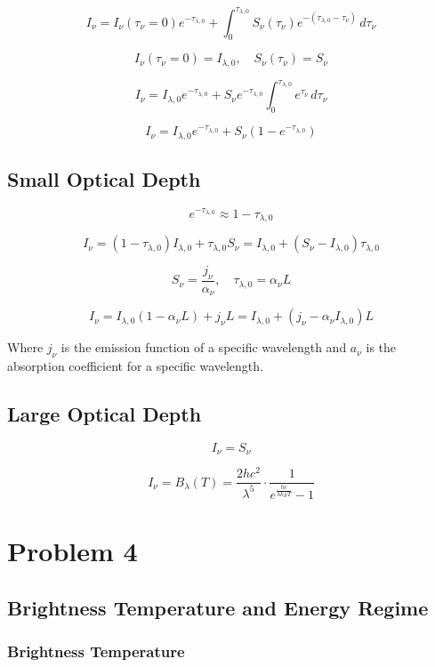 \documentclass[12pt]{article}
\begin{document}
\[
    I_\nu = I_\nu(\tau_\nu=0) e^{-\tau_{\lambda,0}} + \int_{0}^{\tau_{\lambda,0}} S_\nu(\tau_\nu) e^{-(\tau_{\lambda,0} - \tau_\nu)} \, d\tau_\nu
\]

\[
    I_\nu(\tau_\nu=0) = I_{\lambda,0},\quad S_\nu(\tau_\nu) = S_\nu
\]

\[
    I_\nu = I_{\lambda,0} e^{-\tau_{\lambda,0}} + S_\nu e^{-\tau_{\lambda,0}} \int_{0}^{\tau_{\lambda,0}} e^{\tau_\nu} \, d\tau_\nu
\]

\[
    I_\nu = I_{\lambda,0} e^{-\tau_{\lambda,0}} + S_\nu (1 - e^{-\tau_{\lambda,0}})
\]

\subsection{Small Optical Depth}

\[
    e^{-\tau_{\lambda,0}} \approx 1 - \tau_{\lambda,0}
\]

\[
    I_\nu = (1 - \tau_{\lambda,0})I_{\lambda,0} + \tau_{\lambda,0}S_\nu = I_{\lambda,0} + (S_\nu - I_{\lambda,0})\tau_{\lambda,0}
\]

\[
    S_\nu = \frac{j_\nu}{\alpha_\nu},\quad \tau_{\lambda,0} = \alpha_\nu L
\]

\[
    I_\nu = I_{\lambda,0} (1 - \alpha_\nu L) + j_\nu L = I_{\lambda,0} + (j_\nu - \alpha_\nu I_{\lambda,0})L
\]

Where $j_\nu$ is the emission function of a specific wavelength and $a_\nu$ is the absorption coefficient for a specific wavelength.

\subsection{Large Optical Depth}

\[
    I_\nu = S_\nu
\]

\[
    I_\nu = B_\lambda(T) = \frac{2 h c^2}{\lambda^5} \cdot \frac{1}{e^{\frac{h c}{\lambda k_B T}} - 1}
\]

\newpage

\section{Problem 4}

\subsection{Brightness Temperature and Energy Regime}

\subsubsection{Brightness Temperature}
\end{document}
